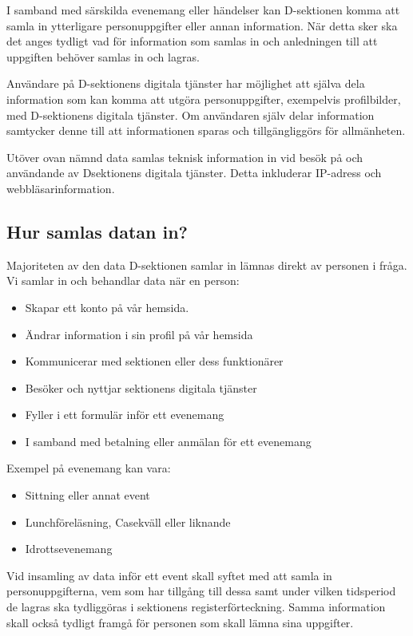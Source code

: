 \documentclass{dsekprotokoll}
\begin{document}
I samband med särskilda evenemang eller händelser kan D-sektionen komma att samla in ytterligare personuppgifter eller annan information. När detta sker ska det anges tydligt vad för information som samlas in och anledningen till att uppgiften behöver samlas in och lagras.

Användare på D-sektionens digitala tjänster har möjlighet att själva dela information som kan komma att utgöra personuppgifter, exempelvis profilbilder, med D-sektionens digitala tjänster. Om användaren själv delar information samtycker denne till att informationen sparas och tillgängliggörs för allmänheten.

Utöver ovan nämnd data samlas teknisk information in vid besök på och användande av Dsektionens digitala tjänster. Detta inkluderar IP-adress och webbläsarinformation.

\subsection{Hur samlas datan in?}
Majoriteten av den data D-sektionen samlar in lämnas direkt av personen i fråga. Vi samlar in och behandlar data när en person:
\begin{itemize}
    \item Skapar ett konto på vår hemsida.
    \item Ändrar information i sin profil på vår hemsida
    \item Kommunicerar med sektionen eller dess funktionärer
    \item Besöker och nyttjar sektionens digitala tjänster
   \item  Fyller i ett formulär inför ett evenemang
   \item I samband med betalning eller anmälan för ett evenemang
\end{itemize}
Exempel på evenemang kan vara:
\begin{itemize}
    \item Sittning eller annat event
    \item Lunchföreläsning, Casekväll eller liknande
    \item Idrottsevenemang
\end{itemize}

Vid insamling av data inför ett event skall syftet med att samla in personuppgifterna, vem som har tillgång till dessa samt under vilken tidsperiod de lagras ska tydliggöras i sektionens registerförteckning. Samma information skall också tydligt framgå för personen som skall lämna sina uppgifter.
\end{document}
